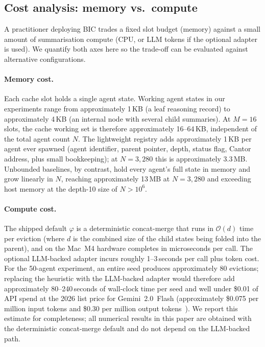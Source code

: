 \documentclass[fleqn,10pt]{article}
\theoremstyle{definition}
\newcommand{\summarize}{\varphi}
\newcommand{\Oh}{\mathcal{O}}
\newcommand{\slots}{M}
\begin{document}
\subsection*{Cost analysis: memory vs.\ compute}

A practitioner deploying BIC trades a fixed slot budget (memory)
against a small amount of summarisation compute (CPU, or LLM tokens
if the optional adapter is used). We quantify both axes here so the
trade-off can be evaluated against alternative configurations.

\paragraph{Memory cost.}
Each cache slot holds a single agent state. Working agent states in
our experiments range from approximately 1\,KB (a leaf reasoning
record) to approximately 4\,KB (an internal node with several child
summaries). At $\slots{=}16$ slots, the cache working set is therefore
approximately 16--64\,KB, independent of the total agent count $N$.
The lightweight registry adds approximately 1\,KB per agent ever
spawned (agent identifier, parent pointer, depth, status flag,
Cantor address, plus small bookkeeping); at $N{=}3{,}280$ this is
approximately 3.3\,MB. Unbounded baselines, by contrast, hold every
agent's full state in memory and grow linearly in $N$, reaching
approximately 13\,MB at $N{=}3{,}280$ and exceeding host memory at
the depth-10 size of $N{>}10^6$.

\paragraph{Compute cost.}
The shipped default $\summarize$ is a deterministic concat-merge
that runs in $\Oh(d)$ time per eviction (where $d$ is the combined
size of the child states being folded into the parent), and on the
Mac~M4 hardware completes in microseconds per call. The optional
LLM-backed adapter incurs roughly 1--3\,seconds per call plus token
cost. For the 50-agent experiment, an entire seed produces
approximately 80 evictions; replacing the heuristic with the
LLM-backed adapter would therefore add approximately 80--240\,seconds
of wall-clock time per seed and well under \$0.01 of API spend at the
2026 list price for Gemini~2.0~Flash (approximately
\$0.075 per million input tokens and \$0.30 per million output
tokens~\citep{gemini2026pricing}). We report this estimate for
completeness; all numerical results in this paper are obtained with
the deterministic concat-merge default and do not depend on the
LLM-backed path.
\end{document}
